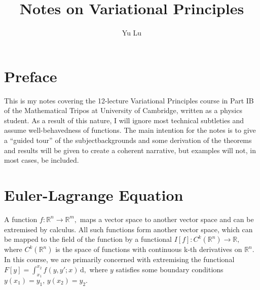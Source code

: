 \documentclass{article}
\title{Notes on Variational Principles}
\author{Yu Lu}
\theoremstyle{nonumberplain}
\begin{document}
\maketitle 
\section*{Preface}
This is my notes covering the 12-lecture Variational Principles course in Part IB of the Mathematical Tripos at University of Cambridge, written as a physics student. As a result of this nature, I will ignore most technical subtleties and assume well-behavedness of functions. The main intention for the notes is to give a ``guided tour'' of the subject\textemdash backgrounds and some derivation of the theorems and results will be given to create a coherent narrative, but examples will not, in most cases, be included. 
\section{Euler-Lagrange Equation}
A function $ f
    \colon \mathbb{R}^n \to \mathbb{R}^m, 
$
maps a vector space to another vector space and can be extremised by calculus. 
All such functions form another vector space, which can be mapped to the field of the function by a functional $I[f]
    \colon C^k(\mathbb{R}^n) \to \mathbb{R},
$
where $C^k(\mathbb{R}^n)$ is the space of functions with continuous k-th derivatives on $\mathbb{R}^n$. In this course, we are primarily concerned with extremising the functional $F[y] = \int_{x_1}^{x_2} f(y,y' ; x) \,\mathrm{d}, $ where $y$ satisfies some boundary conditions $y(x_1)=y_1, \, y(x_2) = y_2.$ 
\end{document}
